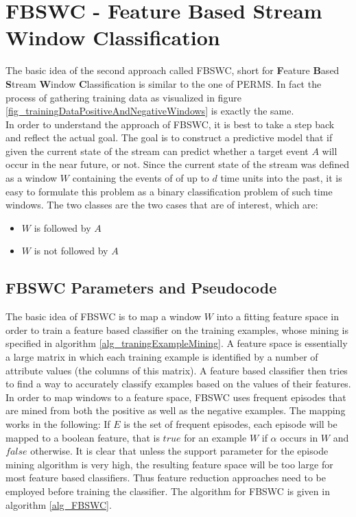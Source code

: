 \section{FBSWC - Feature Based Stream Window Classification}
\label{sec_FeatureBasedStreamWindowClassification}

The basic idea of the second approach called FBSWC, short for \textbf{F}eature \textbf{B}ased \textbf{S}tream \textbf{W}indow \textbf{C}lassification is similar to the one of PERMS. In fact the process of gathering training data as visualized in figure \ref{fig_trainingDataPositiveAndNegativeWindows} is exactly the same. \\
In order to understand the approach of FBSWC, it is best to take a step back and reflect the actual goal. The goal is to construct a predictive model that if given the current state of the stream can predict whether a target event $A$ will occur in the near future, or not. Since the current state of the stream was defined as a window $W$ containing the events of of up to $d$ time units into the past, it is easy to formulate this problem as a binary classification problem of such time windows. The two classes are the two cases that are of interest, which are:

\begin{itemize}
	\item $W$ is followed by $A$
	\item $W$ is not followed by $A$
\end{itemize}

\subsection{FBSWC Parameters and Pseudocode}

The basic idea of FBSWC is to map a window $W$ into a fitting feature space in order to train a feature based classifier on the training examples, whose mining is specified in algorithm \ref{alg_traningExampleMining}. A feature space is essentially a large matrix in which each training example is identified by a number of attribute values (the columns of this matrix). A feature based classifier then tries to find a way to accurately classify examples based on the values of their features. In order to map windows to a feature space, FBSWC uses frequent episodes that are mined from both the positive as well as the negative examples. The mapping works in the following: If $E$ is the set of frequent episodes, each episode will be mapped to a boolean feature, that is $true$ for an example $W$ if $\alpha$ occurs in $W$ and $false$ otherwise. It is clear that unless the support parameter for the episode mining algorithm is very high, the resulting feature space will be too large for most feature based classifiers. Thus feature reduction approaches need to be employed before training the classifier. The algorithm for FBSWC is given in algorithm \ref{alg_FBSWC}.

